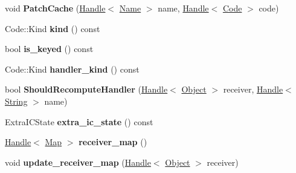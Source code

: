\begin{DoxyCompactItemize}
\item 
void {\bfseries Patch\+Cache} (\hyperlink{classv8_1_1internal_1_1_handle}{Handle}$<$ \hyperlink{classv8_1_1internal_1_1_name}{Name} $>$ name, \hyperlink{classv8_1_1internal_1_1_handle}{Handle}$<$ \hyperlink{classv8_1_1internal_1_1_code}{Code} $>$ code)\hypertarget{classv8_1_1internal_1_1_i_c_a9f433a14510c324fd859c5bff5e64527}{}\label{classv8_1_1internal_1_1_i_c_a9f433a14510c324fd859c5bff5e64527}

\item 
Code\+::\+Kind {\bfseries kind} () const \hypertarget{classv8_1_1internal_1_1_i_c_a53f7505b671156c1476725e8dc23e52a}{}\label{classv8_1_1internal_1_1_i_c_a53f7505b671156c1476725e8dc23e52a}

\item 
bool {\bfseries is\+\_\+keyed} () const \hypertarget{classv8_1_1internal_1_1_i_c_a452b3571e3c3ac125c9357967b448a99}{}\label{classv8_1_1internal_1_1_i_c_a452b3571e3c3ac125c9357967b448a99}

\item 
Code\+::\+Kind {\bfseries handler\+\_\+kind} () const \hypertarget{classv8_1_1internal_1_1_i_c_aeadc6a13c8bbc057b78aa4a2c3785f11}{}\label{classv8_1_1internal_1_1_i_c_aeadc6a13c8bbc057b78aa4a2c3785f11}

\item 
bool {\bfseries Should\+Recompute\+Handler} (\hyperlink{classv8_1_1internal_1_1_handle}{Handle}$<$ \hyperlink{classv8_1_1internal_1_1_object}{Object} $>$ receiver, \hyperlink{classv8_1_1internal_1_1_handle}{Handle}$<$ \hyperlink{classv8_1_1internal_1_1_string}{String} $>$ name)\hypertarget{classv8_1_1internal_1_1_i_c_ab3bcae24777db190b89bc5f3061e900a}{}\label{classv8_1_1internal_1_1_i_c_ab3bcae24777db190b89bc5f3061e900a}

\item 
Extra\+I\+C\+State {\bfseries extra\+\_\+ic\+\_\+state} () const \hypertarget{classv8_1_1internal_1_1_i_c_abebfb31fdaaf7bb946d9d3e002ccff92}{}\label{classv8_1_1internal_1_1_i_c_abebfb31fdaaf7bb946d9d3e002ccff92}

\item 
\hyperlink{classv8_1_1internal_1_1_handle}{Handle}$<$ \hyperlink{classv8_1_1internal_1_1_map}{Map} $>$ {\bfseries receiver\+\_\+map} ()\hypertarget{classv8_1_1internal_1_1_i_c_af8f84a82ace3a9e9bf03dba4829668c3}{}\label{classv8_1_1internal_1_1_i_c_af8f84a82ace3a9e9bf03dba4829668c3}

\item 
void {\bfseries update\+\_\+receiver\+\_\+map} (\hyperlink{classv8_1_1internal_1_1_handle}{Handle}$<$ \hyperlink{classv8_1_1internal_1_1_object}{Object} $>$ receiver)\hypertarget{classv8_1_1internal_1_1_i_c_a311e918bce9efd7bcecec44ba2bb3ee3}{}\label{classv8_1_1internal_1_1_i_c_a311e918bce9efd7bcecec44ba2bb3ee3}


\end{DoxyCompactItemize}
